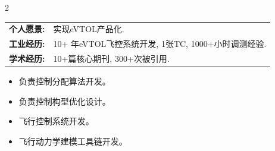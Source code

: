 \documentclass[10pt,a4paper,ragged2e,withhyper]{altacv}
\begin{document}
\begin{paracol}{2}
        
        
        
        
        \switchcolumn
        
        
            \begin{tabular}{@{}ll}
                \textbf{个人愿景:} & 实现eVTOL产品化. \\[0.2em]
                \textbf{工业经历:} & 10+ 年eVTOL飞控系统开发, 1张TC, 1000+小时调测经验.\\[0.2em]
                \textbf{学术经历:} & 10+篇核心期刊, 300+次被引用.\\ %
            \end{tabular}
            
        
            \begin{itemize}
                \item 负责控制分配算法开发。
                \item 负责控制构型优化设计。
                \item 飞行控制系统开发。
                \item 飞行动力学建模工具链开发。
            \end{itemize}
            \bigskip


\end{paracol}
\end{document}
